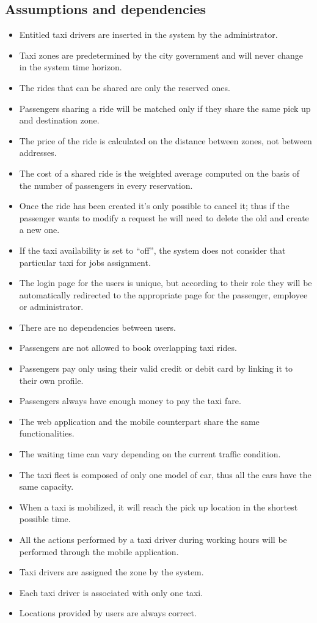 \documentclass[a4paper,11pt]{report} %
\begin{document}
	\subsection{Assumptions and dependencies}
		\begin{itemize}
			\item Entitled taxi drivers are inserted in the system by the administrator.
			\item Taxi zones are predetermined by the city government and will never change in the system time horizon.
			\item The rides that can be shared are only the reserved ones.
			\item Passengers sharing a ride will be matched only if they share the same pick up and destination zone.
			\item The price of the ride is calculated on the distance between zones, not between addresses.
			\item The cost of a shared ride is the weighted average computed on the basis of the number of passengers in every reservation.
			\item Once the ride has been created it's only possible to cancel it; thus if the passenger wants to modify a request he will need to delete the old and create a new one.			
			\item If the taxi availability is set to ``off'', the system does not consider that particular taxi for jobs assignment.
			\item The login page for the users is unique, but according to their role they will be automatically redirected to the appropriate page for the passenger, employee or administrator.
			\item There are no dependencies between users.
			\item Passengers are not allowed to book overlapping taxi rides.
			\item Passengers pay only using their valid credit or debit card by linking it to their own profile.
			\item Passengers always have enough money to pay the taxi fare.
			\item The web application and the mobile counterpart share the same functionalities.
			\item The waiting time can vary depending on the current traffic condition.
			\item The taxi fleet is composed of only one model of car, thus all the cars have the same capacity.
			\item When a taxi is mobilized, it will reach the pick up location in the shortest possible time.
			\item All the actions performed by a taxi driver during working hours will be performed through the mobile application.
			\item Taxi drivers are assigned the zone by the system.
			\item Each taxi driver is associated with only one taxi.
			\item Locations provided by users are always correct.
		\end{itemize}
	
\end{document}

